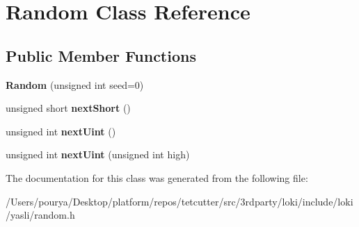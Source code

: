 \hypertarget{classRandom}{}\section{Random Class Reference}
\label{classRandom}
\subsection*{Public Member Functions}
\begin{DoxyCompactItemize}
\item 
\hypertarget{classRandom_a82267f9ab95884a97b68bd6d695257a6}{}{\bfseries Random} (unsigned int seed=0)\label{classRandom_a82267f9ab95884a97b68bd6d695257a6}

\item 
\hypertarget{classRandom_a8e1aae5cd8f0d763351dc0c8a15410b5}{}unsigned short {\bfseries next\+Short} ()\label{classRandom_a8e1aae5cd8f0d763351dc0c8a15410b5}

\item 
\hypertarget{classRandom_a73ebff94a0c5d86e9373d13e3dd9b5ca}{}unsigned int {\bfseries next\+Uint} ()\label{classRandom_a73ebff94a0c5d86e9373d13e3dd9b5ca}

\item 
\hypertarget{classRandom_a286a4351b84bd36a3b74cca1ff3c67f2}{}unsigned int {\bfseries next\+Uint} (unsigned int high)\label{classRandom_a286a4351b84bd36a3b74cca1ff3c67f2}

\end{DoxyCompactItemize}


The documentation for this class was generated from the following file\+:\begin{DoxyCompactItemize}
\item 
/\+Users/pourya/\+Desktop/platform/repos/tetcutter/src/3rdparty/loki/include/loki/yasli/random.\+h\end{DoxyCompactItemize}
